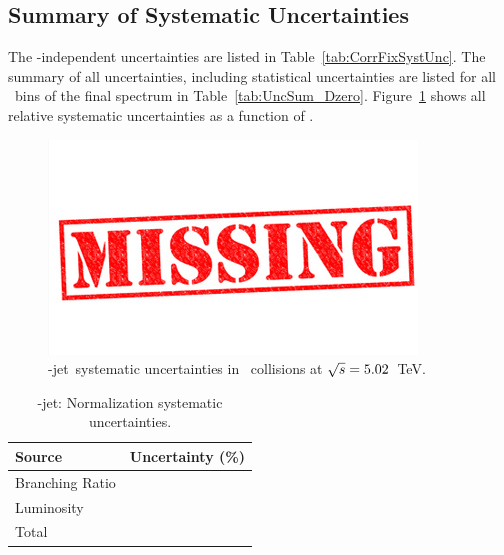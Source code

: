 \subsection{Summary of Systematic Uncertainties}

The \pt-independent uncertainties are listed in Table~\ref{tab:CorrFixSystUnc}. 
The summary of all uncertainties, including statistical uncertainties are listed for all \ptchjet\ bins of the final spectrum in Table~\ref{tab:UncSum_Dzero}.
Figure~\ref{fig:SysUnce_Dzero} shows all relative systematic uncertainties as a function of \ptchjet.

\begin{figure}[bth]
\centering
\includegraphics[width=.3\textwidth]{missing}
\caption{\Dzero-jet\ systematic uncertainties in \pp\ collisions at $\sqrt{s}=5.02$~TeV.}
\label{fig:SysUnce_Dzero}
\end{figure}


\begin{table}[bth]
\caption{\Dzero-jet: Normalization systematic uncertainties.}
     \label{tab:CorrFixSystUnc_Dzero}
\begin{center}
    \begin{tabular}{lr}
    \hline
Source & Uncertainty (\%) \\ \hline
Branching Ratio &  \\
Luminosity &  \\
\hline
Total &  \\
\hline
    \end{tabular}
    \end{center}
    \end{table}
    
